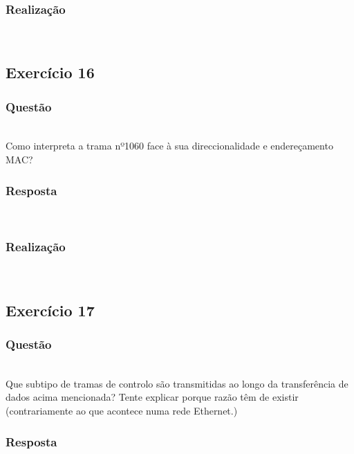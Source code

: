 \documentclass{llncs}
\begin{document}
\subsubsection{Realização}\rule[-10pt]{0pt}{10pt}\\



\clearpage
\subsection{Exercício 16}
\subsubsection{Questão}\rule[-10pt]{0pt}{10pt}\\

Como interpreta a trama nº1060 face à sua direccionalidade e endereçamento MAC?

\subsubsection{Resposta}\rule[-10pt]{0pt}{10pt}\\



\subsubsection{Realização}\rule[-10pt]{0pt}{10pt}\\



\clearpage
\subsection{Exercício 17}
\subsubsection{Questão}\rule[-10pt]{0pt}{10pt}\\

Que subtipo de tramas de controlo são transmitidas ao longo da transferência de dados acima mencionada? Tente explicar porque razão têm de existir (contrariamente ao que acontece numa rede Ethernet.)

\subsubsection{Resposta}\rule[-10pt]{0pt}{10pt}\\
\end{document}
